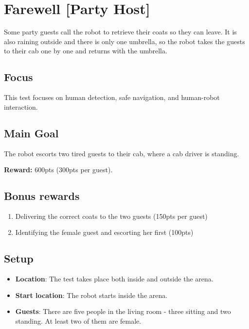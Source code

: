 \section{Farewell [Party Host]}
\label{test:farewell}
Some party guests call the robot to retrieve their coats so they can leave.
It is also raining outside and there is only one umbrella, so the robot takes the guests to their cab one by one and returns with the umbrella.

\subsection*{Focus}
This test focuses on human detection, safe navigation, and human-robot interaction.

\subsection*{Main Goal}
The robot escorts two tired guests to their cab, where a cab driver is standing.

\noindent\textbf{Reward:} 600pts (300pts per guest).

\subsection*{Bonus rewards}
\begin{enumerate}[nosep]
	\item Delivering the correct coats to the two guests (150pts per guest)
	\item Identifying the female guest and escorting her first (100pts)
\end{enumerate}


\subsection*{Setup}
\begin{itemize}
	\item \textbf{Location}: The test takes place both inside and outside the arena.
	\item \textbf{Start location}: The robot starts inside the arena.
	\item \textbf{Guests}: There are five people in the living room - three sitting and two standing. At least two of them are female.
\end{itemize}

